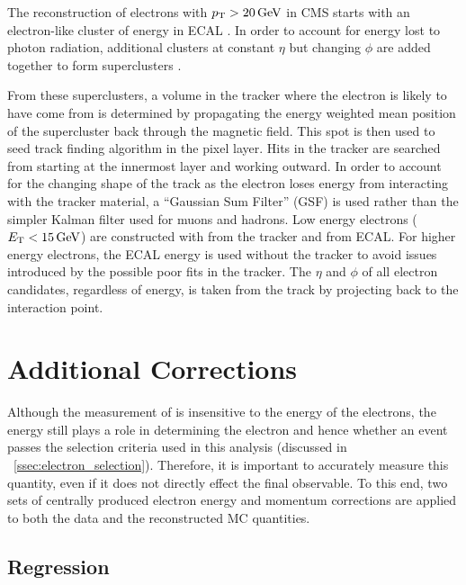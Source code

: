 The reconstruction of electrons with $p_{\mathrm{T}} > 20 \,\text{Ge\hspace{-.08em}V}$ in CMS starts with an
electron-like cluster of energy in ECAL \cite{eg_reco_2010}. In order to
account for energy lost to photon radiation, additional clusters at constant
$\eta$ but changing $\phi$ are added together to form superclusters
\cite{baffioni_2007}. 

From these superclusters, a volume in the tracker where the electron is likely
to have come from is determined by propagating the energy weighted mean
position of the supercluster back through the magnetic field. This spot is then
used to seed  track finding algorithm in the pixel layer. Hits in the tracker
are searched from starting at the innermost layer and working outward. In order
to account for the changing shape of the track as the electron loses energy
from interacting with the tracker material, a ``Gaussian Sum Filter'' (GSF)
\cite{adam_2005} is used rather than the simpler Kalman filter used for muons
and hadrons. Low energy electrons ($E_{\mathrm{T}} < 15 \,\text{Ge\hspace{-.08em}V}$) are constructed with \pt
from the tracker and \ET from ECAL. For higher energy electrons, the ECAL
energy is used without the tracker \pt to avoid issues introduced by the
possible poor fits in the tracker. The $\eta$ and $\phi$ of all electron
candidates, regardless of energy, is taken from the track by projecting back to
the interaction point.

\section{Additional Corrections}

Although the measurement of \phistar is insensitive to the energy of the
electrons, the energy still plays a role in determining the electron \pt and
hence whether an event passes the selection criteria used in this analysis
(discussed in \SEC~\ref{ssec:electron_selection}). Therefore, it is important
to accurately measure this quantity, even if it does not directly effect the
final observable. To this end, two sets of centrally produced electron energy
and momentum corrections are applied to both the data and the reconstructed MC
quantities.

\subsection{Regression}

